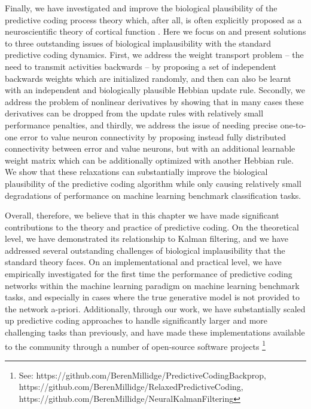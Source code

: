 Finally, we have investigated and improve the biological plausibility of the predictive coding process theory which, after all, is often explicitly proposed as a neuroscientific theory of cortical function \citep{friston2003learning,bastos2012canonical}. Here we focus on and present solutions to three outstanding issues of biological implausibility with the standard predictive coding dynamics. First, we address the weight transport problem -- the need to transmit activities backwards -- by proposing a set of independent backwards weights which are initialized randomly, and then can also be learnt with an independent and biologically plausible Hebbian update rule. Secondly, we address the problem of nonlinear derivatives by showing that in many cases these derivatives can be dropped from the update rules with relatively small performance penalties, and thirdly, we address the issue of needing precise one-to-one error to value neuron connectivity by proposing instead fully distributed connectivity between error and value neurons, but with an additional learnable weight matrix which can be additionally optimized with another Hebbian rule. We show that these relaxations can substantially improve the biological plausibility of the predictive coding algorithm while only causing relatively small degradations of performance on machine learning benchmark classification tasks.

Overall, therefore, we believe that in this chapter we have made significant contributions to the theory and practice of predictive coding. On the theoretical level, we have demonstrated its relationship to Kalman filtering, and we have addressed several outstanding challenges of biological implausibility that the standard theory faces. On an implementational and practical level, we have empirically investigated for the first time the performance of predictive coding networks within the machine learning paradigm on machine learning benchmark tasks, and especially in cases where the true generative model is not provided to the network a-priori. Additionally, through our work, we have substantially scaled up predictive coding approaches to handle significantly larger and more challenging tasks than previously, and have made these implementations available to the community through a number of open-source software projects \footnote{See: https://github.com/BerenMillidge/PredictiveCodingBackprop, https://github.com/BerenMillidge/RelaxedPredictiveCoding, https://github.com/BerenMillidge/NeuralKalmanFiltering}

